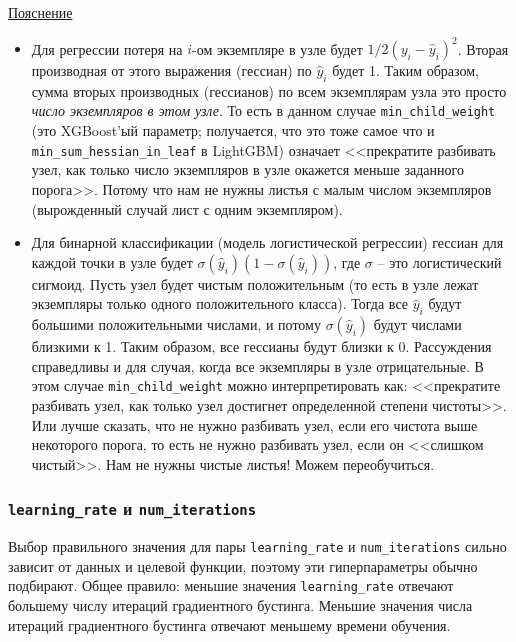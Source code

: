 \documentclass[%
	11pt,
	a4paper,
	utf8,
		]{article}
\begin{document}
\href{https://stats.stackexchange.com/questions/317073/explanation-of-min-child-weight-in-xgboost-algorithm}{Пояснение}
\begin{itemize}
	\item Для регрессии потеря на $ i $-ом экземпляре в узле будет $ 1/2 (y_i - \hat{y}_i)^2 $. Вторая производная от этого выражения (гессиан) по $ \hat{y}_i $ будет 1. Таким образом, сумма вторых производных (гессианов) по всем экземплярам узла это просто \emph{число экземпляров в этом узле}. То есть в данном случае \verb|min_child_weight| (это XGBoost'ый параметр; получается, что это тоже самое что и \verb|min_sum_hessian_in_leaf| в LightGBM) означает <<прекратите разбивать узел, как только число экземпляров в узле окажется меньше заданного порога>>. Потому что нам не нужны листья с малым числом экземпляров (вырожденный случай лист с одним экземпляром).
	
	\item Для бинарной классификации (модель логистической регрессии) гессиан для каждой точки в узле будет $ \sigma(\hat{y}_i) (1 - \sigma (\hat{y}_i)) $, где $ \sigma $ -- это логистический сигмоид. Пусть узел будет чистым положительным (то есть в узле лежат экземпляры только одного положительного класса). Тогда все $ \hat{y}_i $ будут большими положительными числами, и потому $ \sigma(\hat{y}_i) $ будут числами близкими к 1. Таким образом, все гессианы будут близки к 0. Рассуждения справедливы и для случая, когда все экземпляры в узле отрицательные. В этом случае \verb|min_child_weight| можно интерпретировать как: <<прекратите разбивать узел, как только узел достигнет определенной степени чистоты>>. Или лучше сказать, что не нужно разбивать узел, если его чистота выше некоторого порога, то есть не нужно разбивать узел, если он <<слишком чистый>>. Нам не нужны чистые листья! Можем переобучиться.
\end{itemize}

\subsubsection{\texttt{learning\_rate} и \texttt{num\_iterations}}

Выбор правильного значения для пары \verb|learning_rate| и \verb|num_iterations| сильно зависит от данных и целевой функции, поэтому эти гиперпараметры обычно подбирают. Общее правило: меньшие значения \verb|learning_rate| отвечают большему числу итераций градиентного бустинга. Меньшие значения числа итераций градиентного бустинга отвечают меньшему времени обучения.
\end{document}
